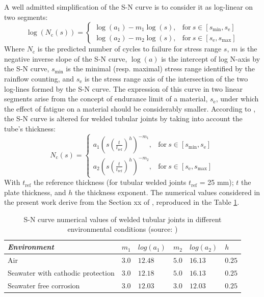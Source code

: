 A well admitted simplification of the S-N curve is to consider it as log-linear on two segments:
\begin{equation}
\log(N_{\mathrm{c}}(s)) = \left\{
    \begin{array}{ll}
        \log(a_1) - m_1 \log(s), & \mbox{for}~ s \in [s_{\mathrm{min}}, s_{\mathrm{e}}] \\
        \log(a_2) - m_2 \log(s), & \mbox{for}~ s \in [s_{\mathrm{e}}, s_{\mathrm{max}}]
    \end{array}
\right.
\end{equation}
Where $N_{\mathrm{c}}$ is the predicted number of cycles to failure for stress range $s$, $m$ is the negative inverse slope of the S-N curve, 
$\log(a)$ is the intercept of log N-axis by the S-N curve, $s_{\mathrm{min}}$ is the minimal (resp. maximal) stress range identified by the rainflow counting, 
and $s_{\mathrm{e}}$ is the stress range axis of the intersection of the two log-lines formed by the S-N curve. 
The expression of this curve in two linear segments arise from the concept of endurance limit of a material, $s_{\mathrm{e}}$, under which the effect of fatigue on a material should be considerably smaller. 
According to \cite{dnv_fatigue_2016}, the S-N curve is altered for welded tubular joints by taking into account the tube's thickness:
\begin{equation}
N_{\mathrm{c}}(s) = \left\{
    \begin{array}{ll}
        a_{1} \left(s (\frac{t}{t_{\mathrm{ref}}})^h\right) ^{-m_1}, & \mbox{for}~ s \in [s_{\mathrm{min}}, s_{\mathrm{e}}]\\
        a_{2} \left(s (\frac{t}{t_{\mathrm{ref}}})^h\right)^{-m_2}, & \mbox{for}~ s \in [s_{\mathrm{e}}, s_{\mathrm{max}}]
    \end{array}
\right.
\end{equation}
With $t_{\mathrm{ref}}$ the reference thickness (for tubular welded joints $t_{\mathrm{ref}}$ = 25 mm); $t$ the plate thickness, and $h$ the thickness exponent.
The numerical values considered in the present work derive from the Section xx of \citet{dnv_fatigue_2016}, reproduced in the Table \ref*{tab:sn_table}.

\begin{table}[h]
    \centering
    \caption{S-N curve numerical values of welded tubular joints in different environmental conditions (source: \cite{dnv_fatigue_2016})}
    \begin{tabular}{l|l|l|l|l|l}
     \hline
     \textit{Environment} & $m_1$ & $log(a_1)$ & $m_2$ & $log(a_2)$ & $h$\\
     \hline
     Air & $3.0$ & $12.48$ & $5.0$ & $16.13$ & $0.25$\\
     Seawater with cathodic protection & $3.0$ & $12.18$ & $5.0$ & $16.13$ & $0.25$\\ Seawater free corrosion & $3.0$ & $12.03$ & $3.0$ & $12.03$ & $0.25$\\ 
    \end{tabular}
    \label{tab:sn_table}
\end{table}

